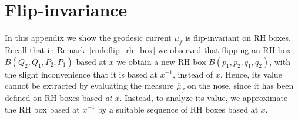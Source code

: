 \section{Flip-invariance}

In this appendix we show the geodesic current $\overline \mu_f$ is flip-invariant on RH boxes.
Recall that in Remark~\ref{rmk:flip_rh_box} we observed that flipping an RH box $B(Q_2,Q_1,P_2,P_1)$ based at $x$ we obtain a new RH box $B(p_1,p_2,q_1,q_2)$, with the slight inconvenience that it is based at $x^{-1}$, instead of $x$. Hence, its value cannot be extracted by evaluating the measure $\overline \mu_f$ on the nose, since it has been defined on RH boxes based \emph{at $x$}. Instead, to analyze its value, we approximate the RH box based at $x^{-1}$ by a suitable sequence of RH boxes based at $x$.

\begin{figure}
\end{figure}

